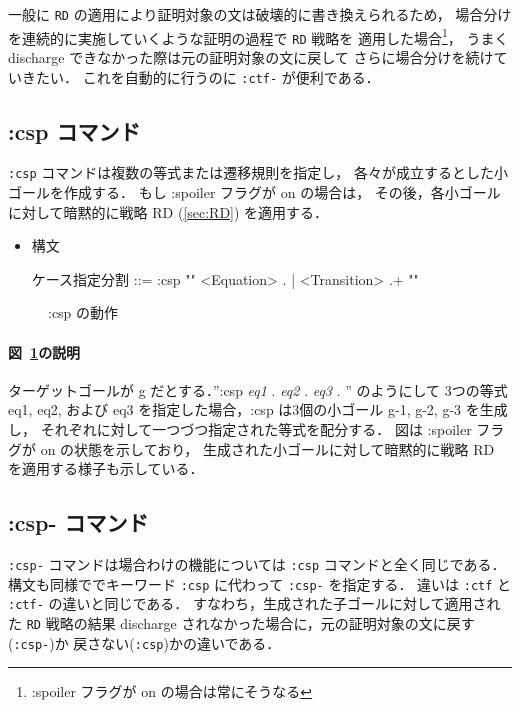 \documentclass[a4paper,oneside,10pt,here]{memoir}
\newenvironment{vvtm}%
{\parskip=0pt\lineskip=0pt\begin{center}\begin{minipage}{0.8\textwidth}\begin{snugshade}}%
  {\end{snugshade}\end{minipage}\end{center}}
\begin{document}
一般に \texttt{RD} の適用により証明対象の文は破壊的に書き換えられるため，
場合分けを連続的に実施していくような証明の過程で \texttt{RD} 戦略を
適用した場合\footnote{:spoiler フラグが on の場合は常にそうなる}，
うまく discharge できなかった際は元の証明対象の文に戻して
さらに場合分けを続けていきたい．
これを自動的に行うのに \texttt{:ctf-} が便利である．


\subsection{:csp コマンド}\label{sec:csp}
\texttt{:csp} コマンドは複数の等式または遷移規則を指定し，
各々が成立するとした小ゴールを作成する．
もし :spoiler フラグが on の場合は，
その後，各小ゴールに対して暗黙的に戦略 RD (\ref{sec:RD}) を適用する．

\begin{itemize}
\item 構文
  \begin{vvtm}
    \begin{simplev}
      ケース指定分割 ::= :csp "{" { <Equation> . | <Transition> .}+ "}"
    \end{simplev}
  \end{vvtm}
\end{itemize}

\begin{figure}[hbt]
  \centering
  
  \caption{:csp の動作}
  \label{fig:csp}
\end{figure}

\paragraph{図~\ref{fig:csp}の説明}
ターゲットゴールが g だとする．”:csp { \textit{eq1} . \textit{eq2} . \textit{eq3} . }” のようにして
3つの等式 eq1, eq2, および eq3 を指定した場合，:csp は3個の小ゴール g-1, g-2, g-3 を生成し，
それぞれに対して一つづつ指定された等式を配分する．
図は :spoiler フラグが on の状態を示しており，
生成された小ゴールに対して暗黙的に戦略 RD を適用する様子も示している．

\subsection{:csp- コマンド}\label{sec:csp-}
\texttt{:csp-} コマンドは場合わけの機能については \texttt{:csp} コマンドと全く同じである．
構文も同様ででキーワード \texttt{:csp} に代わって \texttt{:csp-} を指定する．
違いは \texttt{:ctf} と \texttt{:ctf-} の違いと同じである．
すなわち，生成された子ゴールに対して適用された \texttt{RD} 戦略の結果
discharge されなかった場合に，元の証明対象の文に戻す(\texttt{:csp-})か
戻さない(\texttt{:csp})かの違いである．
\end{document}
